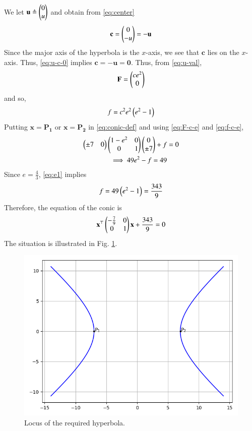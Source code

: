 \documentclass[journal,12pt,twocolumn]{IEEEtran}
\renewcommand{\vec}[1]{\boldsymbol{\mathbf{#1}}}
\begin{document}
\begin{enumerate}
\begin{align}
        \label{eq:center}
    \end{align}
    We let $\vec{u} \triangleq \myvec{0\\u}$ and obtain from \eqref{eq:center}
    \begin{align}
        \vec{c} = \myvec{0\\-u} = -\vec{u}
        \label{eq:u-c-0}
    \end{align}
    Since the major axis of the hyperbola is the $x$-axis, we see that $\vec{c}$
    lies on the $x$-axis. Thus, \eqref{eq:u-c-0} implies $\vec{c} = -\vec{u} 
    = \vec{0}$. Thus, from \eqref{eq:u-val},
    \begin{align}
        \vec{F} = \myvec{ce^2\\0}
        \label{eq:F-c-e}
    \end{align}
    and so,
    \begin{align}
        f = c^2e^2\left(e^2-1\right)
        \label{eq:f-c-e}
    \end{align}
    Putting $\vec{x} = \vec{P_1}$ or $\vec{x} = \vec{P_2}$ in \eqref{eq:conic-def} 
    and using \eqref{eq:F-c-e} and \eqref{eq:f-c-e},
    \begin{align}
        \begin{pmatrix}\pm7&0\end{pmatrix}\begin{pmatrix}1-e^2&0\\0&1\end{pmatrix}\begin{pmatrix}0\\\pm7\end{pmatrix} + f &= 0 \\
        \implies 49e^2 - f = 49 \label{eq:e1}
    \end{align}
    Since $e = \frac{4}{3}$, \eqref{eq:e1} implies
    \begin{align}
        f = 49\left(e^2-1\right) = \frac{343}{9}
    \end{align}
    Therefore, the equation of the conic is
    \begin{align}
        \vec{x}^\top\myvec{-\frac{7}{9}&0\\0&1}\vec{x} + \frac{343}{9} = 0
    \end{align}
    The situation is illustrated in Fig. \ref{fig:hyperbola}.
    \begin{figure}[!ht]
        \centering
        \includegraphics[width=\columnwidth]{figs/hyperbola.png}
        \caption{Locus of the required hyperbola.}
        \label{fig:hyperbola}
    \end{figure}
\end{enumerate}
\end{document}
